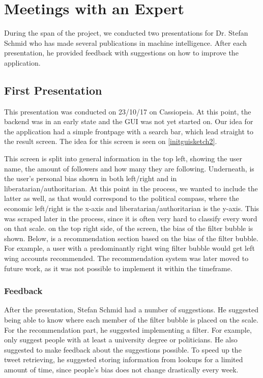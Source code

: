 \section{Meetings with an Expert} \label{expMeeting}
During the span of the project, we conducted two presentations for Dr. Stefan
Schmid who has made several publications in machine intelligence. After
each presentation, he provided feedback with suggestions on how to improve
the application.
 
\subsection{First Presentation}\label{subsec:Exp1}
This presentation was conducted on 23/10/17 on Cassiopeia. At this point, the
backend was in an early state and the \ac{GUI} was not yet started on. Our idea
for the application had a simple frontpage with a search bar, which lead
straight to the result screen. The idea for this screen is seen on
\autoref{initguisketch2}.\nl


This screen is split into general information in the top left, showing the user
name, the amount of followers and how many they are following. Underneath, is
the user's personal bias shown in both left/right and in
liberatarian/authoritarian. At this point in the process, we wanted to include
the latter as well, as that would correspond to the political compass, where the
economic left/right is the x-axis and liberatarian/authoritarian is the y-axis.
This was scraped later in the process, since it is often very hard to classify
every word on that scale. on the top right side, of the screen, the bias of the
filter bubble is shown. Below, is a recommendation section based on the bias of
the filter bubble. For example, a user with a predominantly right wing
filter bubble would get left wing accounts recommended. The recommendation
system was later moved to future work, as it was not possible to implement it within
the timeframe. 

\subsubsection{Feedback}
After the presentation, Stefan Schmid had a number of suggestions. He suggested
being able to know where each member of the filter bubble is placed on the
scale. For the recommendation part, he suggested implementing a filter. For
example, only suggest people with at least a university degree or politicians. 
He also suggested to make feedback about the suggestions possible.
To speed up the tweet retrieving, he suggested storing information from lookups
for a limited amount of time, since people's bias does not change drastically
every week. 

